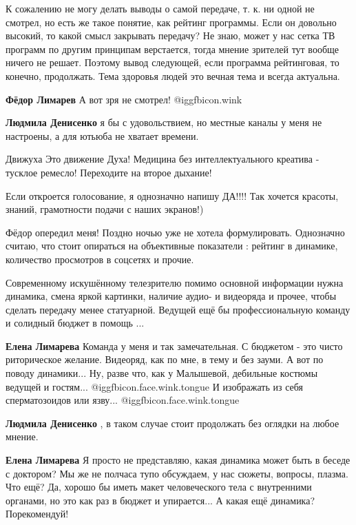 \begin{itemize}

К сожалению не могу делать выводы о самой передаче, т. к. ни одной не смотрел,
но есть же такое понятие, как рейтинг программы. Если он довольно высокий, то
какой смысл закрывать передачу? Не знаю, может у нас сетка ТВ программ по
другим принципам верстается, тогда мнение зрителей тут вообще ничего не решает.
Поэтому вывод следующей, если программа рейтинговая, то конечно, продолжать.
Тема здоровья людей это вечная тема и всегда актуальна.

\begin{itemize} %
\textbf{Фёдор Лимарев} А вот зря не смотрел!  @igg{fbicon.wink} 

\textbf{Людмила Денисенко} я бы с удовольствием, но местные каналы у меня не настроены, а для ютьюба не хватает времени.
\end{itemize} %

Движуха Это движение Духа! Медицина без интеллектуального креатива - тусклое ремесло! Переходите на второе дыхание!

Если откроется голосование, я однозначно напишу ДА!!!! Так хочется красоты, знаний, грамотности подачи с наших экранов!)


Фёдор опередил меня! Поздно ночью уже не хотела формулировать. Однозначно
считаю, что стоит опираться на объективные показатели : рейтинг в динамике,
количество просмотров в соцсетях и прочие.

Современному искушённому телезрителю помимо основной информации нужна динамика,
смена яркой картинки, наличие аудио- и видеоряда и прочее, чтобы сделать
передачу менее статуарной. Ведущей ещё бы профессиональную команду и солидный
бюджет в помощь ...

\begin{itemize} %
\textbf{Елена Лимарева} Команда у меня и так замечательная. С бюджетом - это чисто риторическое желание. Видеоряд, как по мне, в тему и без зауми. А вот по поводу динамики... Ну, разве что, как у Малышевой, дебильные костюмы ведущей и гостям...  @igg{fbicon.face.wink.tongue}  И изображать из себя сперматозоидов или язву...  @igg{fbicon.face.wink.tongue} 

\textbf{Людмила Денисенко} , в таком случае стоит продолжать без оглядки на любое мнение.


\textbf{Елена Лимарева} Я просто не представляю, какая динамика может быть в беседе с доктором? Мы же не полчаса тупо обсуждаем, у нас сюжеты, вопросы, плазма. Что ещё? Да, хорошо бы иметь макет человеческого тела с внутренними органами, но это как раз в бюджет и упирается... А какая ещё динамика? Порекомендуй!


\end{itemize}
\end{itemize}
